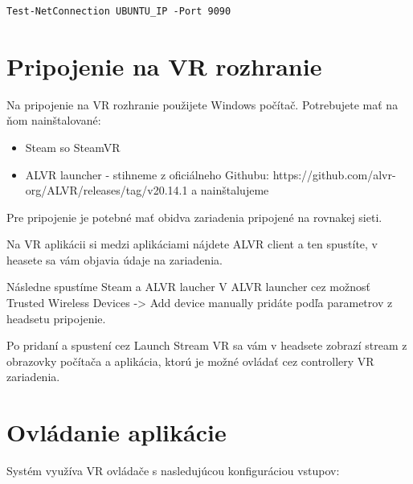 \documentclass[a4paper,12pt]{article}
\begin{document}
\begin{lstlisting}[style=terminal]
Test-NetConnection UBUNTU_IP -Port 9090
\end{lstlisting}


\section{Pripojenie na VR rozhranie}

Na pripojenie na VR rozhranie použijete Windows počítač. Potrebujete mať na ňom nainštalované: 

\begin{itemize}
    \item Steam so SteamVR
    \item ALVR launcher - stihneme z oficiálneho Githubu: https://github.com/alvr-org/ALVR/releases/tag/v20.14.1 a nainštalujeme
\end{itemize}

Pre pripojenie je potebné mať obidva zariadenia pripojené na rovnakej sieti. 

Na VR aplikácii si medzi aplikáciami nájdete ALVR client a ten spustíte, v heasete sa vám objavia údaje na zariadenia.  

Následne spustíme Steam a ALVR laucher 
V ALVR launcher cez možnosť Trusted Wireless Devices -> Add device manually pridáte podľa parametrov z headsetu pripojenie. 

Po pridaní a spustení cez Launch Stream VR sa vám v headsete zobrazí stream z obrazovky počítača a aplikácia, ktorú je možné ovládať cez controllery VR zariadenia. 

\section{Ovládanie aplikácie}

Systém využíva VR ovládače s nasledujúcou konfiguráciou vstupov:
\end{document}
